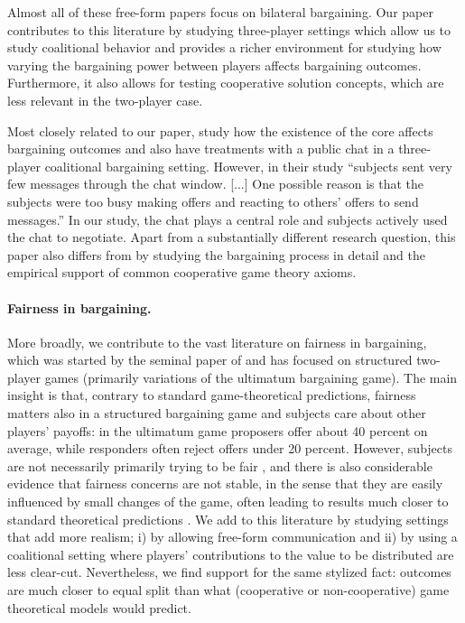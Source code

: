 Almost all of these free-form papers focus on bilateral bargaining. Our paper contributes to this literature by studying three-player settings which allow us to study coalitional behavior and provides a richer environment for studying how varying the bargaining power between players affects bargaining outcomes. Furthermore, it also allows for testing cooperative solution concepts, which are less relevant in the two-player case.

Most closely related to our paper, \textcite{ShinodaFunaki2022} study how the existence of the core affects bargaining outcomes and also have treatments with a public chat in a three-player coalitional bargaining setting. However, in their study ``subjects sent very few messages through the chat window. [...] One possible reason is that the subjects were too busy making offers and reacting to others' offers to send messages.'' In our study, the chat plays a central role and subjects actively used the chat to negotiate. Apart from a substantially different research question, this paper also differs from \textcite{ShinodaFunaki2022} by studying the bargaining process in detail and the empirical support of common cooperative game theory axioms.


\paragraph{Fairness in bargaining.}

More broadly, we contribute to the vast literature on fairness in bargaining, which was started by the seminal paper of \textcite{Güthetal1982} and has focused on structured two-player games (primarily variations of the ultimatum bargaining game). The main insight is that, contrary to standard game-theoretical predictions, fairness matters also in a structured bargaining game and subjects care about other players' payoffs: in the ultimatum game proposers offer about 40 percent on average, while responders often reject offers under 20 percent. However, subjects are not necessarily primarily trying to be fair \parencite[]{Roth1995}, and there is also considerable evidence that fairness concerns are not stable, in the sense that they are easily influenced by small changes of the game, often leading to results much closer to standard theoretical predictions \parencite[e.g.]{Binmoreetal1985, GrimmMengel2011}. We add to this literature by studying settings that add more realism; i) by allowing free-form communication and ii) by using a coalitional setting where players' contributions to the value to be distributed are less clear-cut. Nevertheless, we find support for the same stylized fact: outcomes are much closer to equal split than what (cooperative or non-cooperative) game theoretical models would predict.

